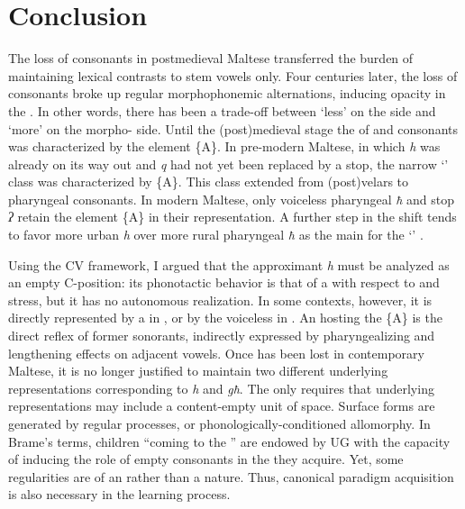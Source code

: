\documentclass[output=paper]{langsci/langscibook}
\begin{document}
\section{Conclusion}
The loss of  consonants in postmedieval Maltese transferred the burden of maintaining lexical contrasts to stem vowels only. Four centuries later, the loss of  consonants broke up regular morphophonemic alternations, inducing opacity in the . In other words, there has been a trade-off between ‘less’ on the  side and ‘more’ on the morpho- side. Until the (post)medieval stage the  of  and  consonants was characterized by the element \{A\}. In pre-modern Maltese, in which \textit{h} was already on its way out and \textit{q} had not yet been replaced by a  stop, the narrow ‘’ class was characterized by \{A\}. This class extended from (post)velars to pharyngeal consonants. In modern Maltese, only voiceless pharyngeal \textit{ħ} and  stop \textit{ʔ} retain the element \{A\} in their representation. A further step in the  shift tends to favor more urban  \textit{h} over more rural pharyngeal \textit{ħ} as the main  for the ‘’ . 

Using the CV framework, I argued that the   approximant \textit{h} must be analyzed as an empty C-position: its phonotactic behavior is that of a  with respect to  and stress, but it has no autonomous realization. In some contexts, however, it is directly represented by a  in , or by the voiceless   in . An  hosting the  \{A\} is the direct reflex of former  sonorants, indirectly expressed by pharyngealizing and lengthening effects on adjacent vowels. Once  has been lost in contemporary Maltese, it is no longer justified to maintain two different underlying representations corresponding to  \textit{h} and \textit{għ}. The  only requires that underlying representations may include a content-empty unit of  space. Surface forms are generated by regular  processes, or phonologically-conditioned allomorphy. In Brame's terms, children “coming to the ” are endowed by UG with the capacity of inducing the role of empty consonants in the  they acquire. Yet, some regularities are of an  rather than a  nature. Thus, canonical paradigm acquisition is also necessary in the learning process. 
\end{document}
